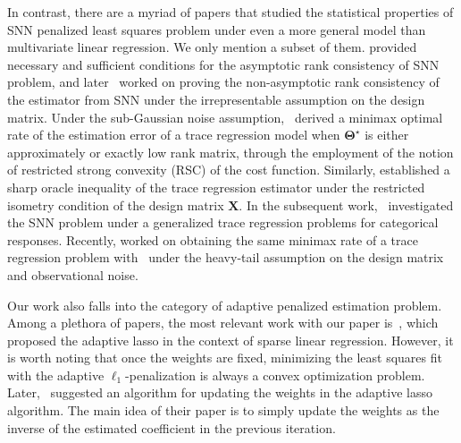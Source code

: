 \documentclass[alpha-refs]{wiley-article}
\begin{document}
In contrast, there are a myriad of papers that studied the statistical properties of SNN penalized least squares problem under even a more general model than multivariate linear regression.
We only mention a subset of them.
\citet{bach2008consistency} provided necessary and sufficient conditions for the asymptotic rank consistency of SNN problem, and later~\citet{lee2015model} worked on proving the non-asymptotic rank consistency of the estimator from SNN under the irrepresentable assumption on the design matrix.
Under the sub-Gaussian noise assumption,~\citet{negahban2011estimation} derived a minimax optimal rate of the estimation error of a trace regression model when $\boldsymbol{\Theta}^{\star}$ is either approximately or exactly low rank matrix, through the employment of the notion of restricted strong convexity (RSC) of the cost function.
Similarly, \citet{koltchinskii2011nuclear} established a sharp oracle inequality of the trace regression estimator under the restricted isometry condition of the design matrix $\boldsymbol{X}$.
In the subsequent work,~\citet{fan2019generalized} investigated the SNN problem under a generalized trace regression problems for categorical responses.
Recently, \citet{fan2021shrinkage} worked on obtaining the same minimax rate of a trace regression problem with~\citet{negahban2011estimation} under the heavy-tail assumption on the design matrix and observational noise.

Our work also falls into the category of adaptive penalized estimation problem.
Among a plethora of papers, the most relevant work with our paper is~\citet{zou2006adaptive}, which proposed the adaptive lasso in the context of sparse linear regression.
However, it is worth noting that once the weights are fixed, minimizing the least squares fit with the adaptive $\ell_{1}$-penalization is always a convex optimization problem.
Later,~\citet{candes2008enhancing} suggested an algorithm for updating the weights in the adaptive lasso algorithm.
The main idea of their paper is to simply update the weights as the inverse of the estimated coefficient in the previous iteration.
\end{document}
